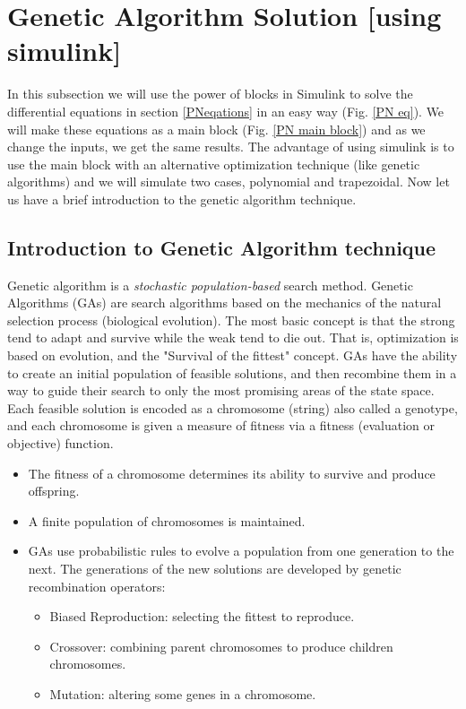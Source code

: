 
\section{Genetic Algorithm Solution [using simulink]}


In this subsection we will use the power of blocks in Simulink to solve the differential equations in section \ref{PNeqations} in an easy way (Fig. \ref{PN eq}). We will make these equations as a main block (Fig. \ref{PN main block}) and as we change the inputs, we get the same results. The advantage of using simulink is to use the main block with an alternative optimization technique (like genetic algorithms) and we will simulate two cases, polynomial and trapezoidal. Now let us have a brief introduction to the genetic algorithm technique.

\subsection{Introduction to Genetic Algorithm technique}
Genetic algorithm is a \textit{stochastic population-based} search method. Genetic Algorithms (GAs) are   search algorithms based on the mechanics of the natural selection process (biological evolution).  The most basic concept is that the strong tend to adapt and survive while the weak tend to die out. That is, optimization is based on evolution, and the "Survival of the fittest" concept.
GAs have the ability to create an initial population of feasible solutions, and then recombine them in a way to guide their search to only the most promising areas of the state space.   
Each feasible solution is encoded as a chromosome (string) also called a genotype, and each chromosome is given a measure of fitness via a fitness (evaluation or objective) function. 

\begin{itemize}
	\item The fitness of a chromosome determines its ability to survive and produce offspring.
	\item A finite population of chromosomes is maintained.
	\item GAs  use  probabilistic  rules  to  evolve  a  population from  one  generation to the next.  The generations of the new solutions are developed by genetic recombination operators:
	\begin{itemize}
		\item Biased Reproduction: selecting the fittest to reproduce.
		\item Crossover: combining parent chromosomes to produce children chromosomes.
		\item Mutation: altering some genes in a chromosome.
	\end{itemize}
\end{itemize}

